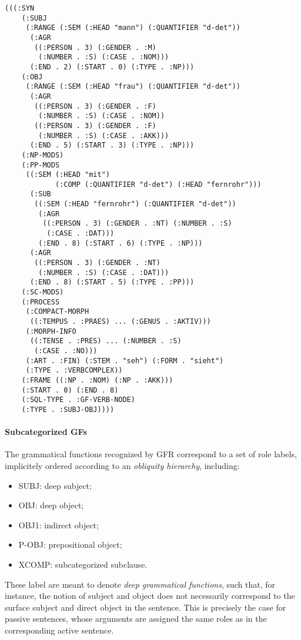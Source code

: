 \begin{verbatim}
(((:SYN
    (:SUBJ
     (:RANGE (:SEM (:HEAD "mann") (:QUANTIFIER "d-det"))
      (:AGR
       ((:PERSON . 3) (:GENDER . :M) 
        (:NUMBER . :S) (:CASE . :NOM)))
      (:END . 2) (:START . 0) (:TYPE . :NP)))
    (:OBJ
     (:RANGE (:SEM (:HEAD "frau") (:QUANTIFIER "d-det"))
      (:AGR
       ((:PERSON . 3) (:GENDER . :F) 
        (:NUMBER . :S) (:CASE . :NOM))
       ((:PERSON . 3) (:GENDER . :F) 
        (:NUMBER . :S) (:CASE . :AKK)))
      (:END . 5) (:START . 3) (:TYPE . :NP)))
    (:NP-MODS)
    (:PP-MODS
     ((:SEM (:HEAD "mit") 
            (:COMP (:QUANTIFIER "d-det") (:HEAD "fernrohr")))
      (:SUB
       ((:SEM (:HEAD "fernrohr") (:QUANTIFIER "d-det"))
        (:AGR
         ((:PERSON . 3) (:GENDER . :NT) (:NUMBER . :S)
          (:CASE . :DAT)))
        (:END . 8) (:START . 6) (:TYPE . :NP)))
      (:AGR
       ((:PERSON . 3) (:GENDER . :NT) 
        (:NUMBER . :S) (:CASE . :DAT)))
      (:END . 8) (:START . 5) (:TYPE . :PP)))
    (:SC-MODS)
    (:PROCESS
     (:COMPACT-MORPH
      ((:TEMPUS . :PRAES) ... (:GENUS . :AKTIV)))
     (:MORPH-INFO
      ((:TENSE . :PRES) ... (:NUMBER . :S)
       (:CASE . :NO)))
     (:ART . :FIN) (:STEM . "seh") (:FORM . "sieht") 
     (:TYPE . :VERBCOMPLEX))
    (:FRAME ((:NP . :NOM) (:NP . :AKK))) 
    (:START . 0) (:END . 8) 
    (:SQL-TYPE . :GF-VERB-NODE)
    (:TYPE . :SUBJ-OBJ))))
\end{verbatim}

\paragraph{Subcategorized GFs} The grammatical functions recognized by GFR
correspond to a set of role labels, implicitely ordered according to an {\em
obliquity hierarchy}, including: 

\begin{itemize}
\item SUBJ: deep subject;
\item OBJ: deep object;
\item OBJ1: indirect object;
\item P-OBJ: prepositional object;
\item XCOMP: subcategorized subclause.
\end{itemize}

These label are meant to denote {\em deep grammatical functions}, such
that, for
instance, the notion of subject and object does not necessarily correspond to
the surface subject and direct object in the sentence. This is precisely the
case for passive sentences, whose arguments are assigned the same roles as in
the corresponding active sentence.

